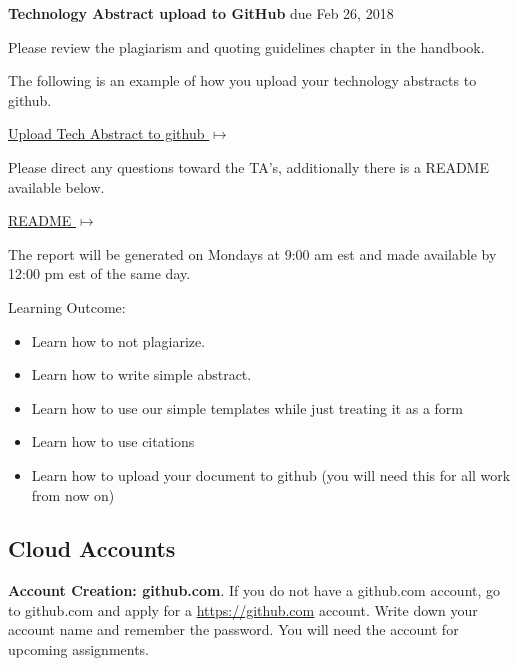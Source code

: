 \begin{exercise}{\bf Technology Abstract upload to GitHub} due Feb 26,
  2018


Please review the plagiarism and quoting guidelines chapter in the
handbook.


The following is an example of how you upload your technology
abstracts to github.
\smallskip

{\hfill \href{https://github.com/cloudmesh-community/hid-sample/tree/master/technology}{Upload
    Tech Abstract to github $\mapsto$}}

\smallskip

Please direct any questions toward the TA's, additionally there is a
README available below. 

{\hfill
  \href{https://github.com/cloudmesh-community/hid-sample/blob/master/technology/README.md}{README
    $\mapsto$}}

\smallskip

The report will be generated on Mondays at 9:00 am est and made
available by 12:00 pm est of the same day.
\smallskip


\end{exercise}

Learning Outcome:

\begin{itemize}
\item Learn how to not plagiarize.
\item Learn how to write simple abstract.
\item Learn how to use our simple templates while just treating it as a
  form
\item Learn how to use citations
\item Learn how to upload your document to github (you will need this
  for all work from now on)

\end{itemize}

\subsection{Cloud Accounts}
\label{a:accounts}
\begin{exercise}

  {\bf Account Creation: github.com}. If you do not have a github.com
  account, go to github.com and apply for a \url{https://github.com}
  account. Write down your account name and remember the password. You
  will need the account for upcoming assignments.

\end{exercise}

